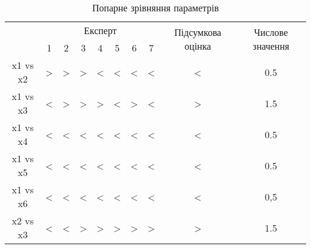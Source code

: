 \documentclass[a4paper,14pt]{extreport}
\begin{document}
\begin{table}[h]
\begin{center}
\caption{Попарне зрівняння параметрів}
\begin{tabular}{|c|ccccccc|c|c|}
\hline
\multirow{2}{*}{} & \multicolumn{7}{c|}{Експерт}                                                                                                                            & \multirow{2}{*}{Підсумкова оцінка} & \multirow{2}{*}{Числове значення} \\ \cline{2-8}
                  & \multicolumn{1}{c|}{1} & \multicolumn{1}{c|}{2} & \multicolumn{1}{c|}{3} & \multicolumn{1}{c|}{4} & \multicolumn{1}{c|}{5} & \multicolumn{1}{c|}{6} & 7 &                                    &                                   \\ \hline
x1 vs  x2         & \multicolumn{1}{c|}{>} & \multicolumn{1}{c|}{>} & \multicolumn{1}{c|}{>} & \multicolumn{1}{c|}{<} & \multicolumn{1}{c|}{<} & \multicolumn{1}{c|}{<} & < & <                                  & 0.5                               \\ \hline
x1 vs x3          & \multicolumn{1}{c|}{<} & \multicolumn{1}{c|}{>} & \multicolumn{1}{c|}{>} & \multicolumn{1}{c|}{>} & \multicolumn{1}{c|}{<} & \multicolumn{1}{c|}{>} & < & >                                  & 1.5                               \\ \hline
x1 vs x4          & \multicolumn{1}{c|}{<} & \multicolumn{1}{c|}{<} & \multicolumn{1}{c|}{<} & \multicolumn{1}{c|}{<} & \multicolumn{1}{c|}{<} & \multicolumn{1}{c|}{<} & < & <                                  & 0.5                               \\ \hline
x1 vs x5          & \multicolumn{1}{c|}{<} & \multicolumn{1}{c|}{<} & \multicolumn{1}{c|}{<} & \multicolumn{1}{c|}{<} & \multicolumn{1}{c|}{<} & \multicolumn{1}{c|}{<} & < & <                                  & 0.5                               \\ \hline
x1 vs x6          & \multicolumn{1}{c|}{<} & \multicolumn{1}{c|}{<} & \multicolumn{1}{c|}{<} & \multicolumn{1}{c|}{<} & \multicolumn{1}{c|}{<} & \multicolumn{1}{c|}{<} & < & <                                  & 0,5                               \\ \hline
x2 vs x3          & \multicolumn{1}{c|}{<} & \multicolumn{1}{c|}{<} & \multicolumn{1}{c|}{>} & \multicolumn{1}{c|}{>} & \multicolumn{1}{c|}{>} & \multicolumn{1}{c|}{>} & > & >                                  & 1.5                               \\ \hline

\end{tabular}
\end{center}
\end{table}
\end{document}
